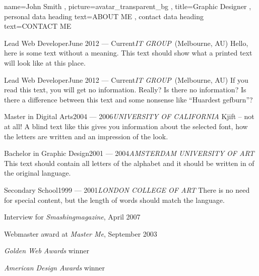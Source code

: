 \documentclass[a4paper, 12pt]{classycv}
\begin{document}
\begin{Resume}[%
    left background color=accent-color%
    , left foreground color=white%
    , left header color=white%
]{%
    name=John Smith%
    , picture={avatar_transparent_bg}%
    , title=Graphic Designer%
    , personal data heading text={\MakeUppercase{about me}}%
    , contact data heading text={\MakeUppercase{contact me}}%
}%
    \begin{Entry}{Lead Web Developer\hfill June 2012 --- Current}{\textit{\MakeUppercase{IT Group}}~(Melbourne, AU)}%
        Hello, here is some text without a meaning. This text should show what a printed text will look like at this place.%
    \end{Entry}%
    \begin{Entry}{Lead Web Developer\hfill June 2012 --- Current}{\textit{\MakeUppercase{IT Group}}~(Melbourne, AU)}%
        If you read this text, you will get no information. Really? Is there no information? Is there a difference between this text and some nonsense like “Huardest gefburn”?%
    \end{Entry}%
    \begin{Entry}{Master in Digital Arts\hfill2004 --- 2006}{\textit{\MakeUppercase{University of California}}}%
        Kjift – not at all! A blind text like this gives you information about the selected font, how the letters are written and an impression of the look.%
    \end{Entry}%
    \begin{Entry}{Bachelor in Graphic Design\hfill2001 --- 2004}{\textit{\MakeUppercase{Amsterdam University of Art}}}%
        This text should contain all letters of the alphabet and it should be written in of the original language.%
    \end{Entry}%
    \begin{Entry}{Secondary School\hfill1999 --- 2001}{\textit{\MakeUppercase{London College of Art}}}%
        There is no need for special content, but the length of words should match the language.%
    \end{Entry}%
    \begin{List}[skip above=0pt, skip below=0pt]
        \item Interview for \textit{Smashingmagazine}, April 2007%
        \item Webmaster award at \textit{Master Me}, September 2003%
        \item \textit{Golden Web Awards} winner%
        \item \textit{American Design Awards} winner%
    \end{List}%
\end{Resume}
\end{document}
